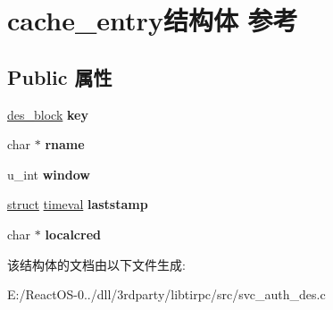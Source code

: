 \hypertarget{structcache__entry}{}\section{cache\+\_\+entry结构体 参考}
\label{structcache__entry}
\subsection*{Public 属性}
\begin{DoxyCompactItemize}
\item 
\mbox{\label{structcache__entry_a6898f7fc6de2fa0b98d9f1f8e20e0044}} 
\hyperlink{uniondes__block}{des\+\_\+block} {\bfseries key}
\item 
\mbox{\label{structcache__entry_adc677f47fbdeddfb2c144e5d10c0ce2a}} 
char $\ast$ {\bfseries rname}
\item 
\mbox{\label{structcache__entry_a0c7798179119a98ba55ef7f863fd122d}} 
u\+\_\+int {\bfseries window}
\item 
\mbox{\label{structcache__entry_acde6585d42f28e15f875b227ec2e49ad}} 
\hyperlink{interfacestruct}{struct} \hyperlink{structtimeval}{timeval} {\bfseries laststamp}
\item 
\mbox{\label{structcache__entry_a7012664f2f5637d8478eb0d29fc47530}} 
char $\ast$ {\bfseries localcred}
\end{DoxyCompactItemize}


该结构体的文档由以下文件生成\+:\begin{DoxyCompactItemize}
\item 
E\+:/\+React\+O\+S-\/0../dll/3rdparty/libtirpc/src/svc\+\_\+auth\+\_\+des.\+c\end{DoxyCompactItemize}
